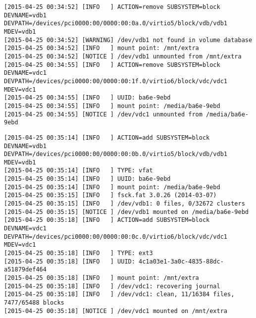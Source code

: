 
\begin{tiny}
\begin{verbatim}
[2015-04-25 00:34:52] [INFO   ] ACTION=remove SUBSYSTEM=block DEVNAME=vdb1 DEVPATH=/devices/pci0000:00/0000:00:0a.0/virtio5/block/vdb/vdb1 MDEV=vdb1
[2015-04-25 00:34:52] [WARNING] /dev/vdb1 not found in volume database
[2015-04-25 00:34:52] [INFO   ] mount point: /mnt/extra
[2015-04-25 00:34:52] [NOTICE ] /dev/vdb1 unmounted from /mnt/extra
[2015-04-25 00:34:55] [INFO   ] ACTION=remove SUBSYSTEM=block DEVNAME=vdc1 DEVPATH=/devices/pci0000:00/0000:00:1f.0/virtio6/block/vdc/vdc1 MDEV=vdc1
[2015-04-25 00:34:55] [INFO   ] UUID: ba6e-9ebd
[2015-04-25 00:34:55] [INFO   ] mount point: /media/ba6e-9ebd
[2015-04-25 00:34:55] [NOTICE ] /dev/vdc1 unmounted from /media/ba6e-9ebd
\end{verbatim}
\end{tiny}


\begin{tiny}
\begin{verbatim}
[2015-04-25 00:35:14] [INFO   ] ACTION=add SUBSYSTEM=block DEVNAME=vdb1 DEVPATH=/devices/pci0000:00/0000:00:0b.0/virtio5/block/vdb/vdb1 MDEV=vdb1
[2015-04-25 00:35:14] [INFO   ] TYPE: vfat
[2015-04-25 00:35:14] [INFO   ] UUID: ba6e-9ebd
[2015-04-25 00:35:14] [INFO   ] mount point: /media/ba6e-9ebd
[2015-04-25 00:35:15] [INFO   ] fsck.fat 3.0.26 (2014-03-07)
[2015-04-25 00:35:15] [INFO   ] /dev/vdb1: 0 files, 0/32672 clusters
[2015-04-25 00:35:15] [NOTICE ] /dev/vdb1 mounted on /media/ba6e-9ebd
[2015-04-25 00:35:18] [INFO   ] ACTION=add SUBSYSTEM=block DEVNAME=vdc1 DEVPATH=/devices/pci0000:00/0000:00:0c.0/virtio6/block/vdc/vdc1 MDEV=vdc1
[2015-04-25 00:35:18] [INFO   ] TYPE: ext3
[2015-04-25 00:35:18] [INFO   ] UUID: 4c1a03e1-3a0c-4835-88dc-a51879def464
[2015-04-25 00:35:18] [INFO   ] mount point: /mnt/extra
[2015-04-25 00:35:18] [INFO   ] /dev/vdc1: recovering journal
[2015-04-25 00:35:18] [INFO   ] /dev/vdc1: clean, 11/16384 files, 7477/65488 blocks
[2015-04-25 00:35:18] [NOTICE ] /dev/vdc1 mounted on /mnt/extra
\end{verbatim}
\end{tiny}

